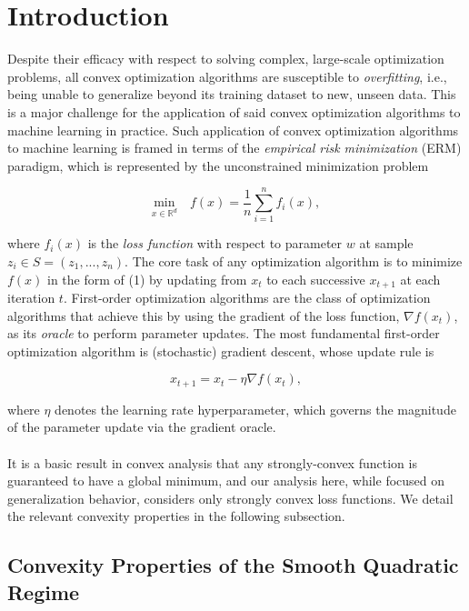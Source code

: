 \documentclass[twoside,11pt]{article}
\begin{document}
\section{Introduction}

Despite their efficacy with respect to solving complex, large-scale optimization problems, all convex optimization algorithms are susceptible to \textit{overfitting}, i.e., being unable to generalize beyond its training dataset to new, unseen data. This is a major challenge for the application of said convex optimization algorithms to machine learning in practice. Such application of convex optimization algorithms to machine learning is framed in terms of the \textit{empirical risk minimization} (ERM) paradigm, which is represented by the unconstrained minimization problem

\begin{equation}
\underset{x \in \mathbb{R}^d}{\text{min}} \quad f(x) = \frac{1}{n}\sum_{i=1}^{n} f_i(x),
\end{equation}

\noindent
where $f_i(x)$ is the \textit{loss function} with respect to parameter $w$ at sample $z_i \in S = (z_1, ...,z_n)$. The core task of any optimization algorithm is to minimize $f(x)$ in the form of (1) by updating from $x_t$ to each successive $x_{t+1}$ at each iteration $t$. First-order optimization algorithms are the class of optimization algorithms that achieve this by using the gradient of the loss function, $\nabla f (x_t)$, as its \textit{oracle} to perform parameter updates. The most fundamental first-order optimization algorithm is (stochastic) gradient descent, whose update rule is

\begin{equation}
x_{t+1} = x_t - \eta \nabla f(x_t), 
\end{equation}

\noindent
where $\eta$ denotes the learning rate hyperparameter, which governs the magnitude of the parameter update via the gradient oracle. \\
\\
It is a basic result in convex analysis that any strongly-convex function is guaranteed to have a global minimum, and our analysis here, while focused on generalization behavior, considers only strongly convex loss functions. We detail the relevant convexity properties in the following subsection.

\subsection{Convexity Properties of the Smooth Quadratic Regime}
\end{document}
